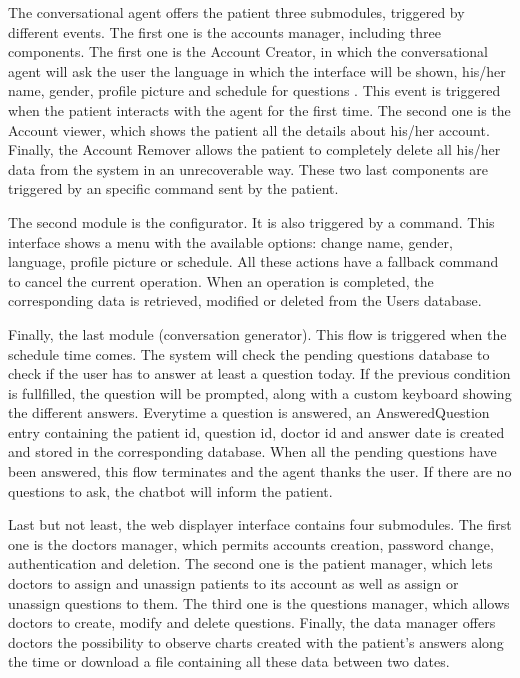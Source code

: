 \documentclass[12pt,english]{article}
\begin{document}
The conversational agent offers the patient three submodules, triggered by different events. The first one is the accounts manager, including three components. The first one is the Account Creator, in which the conversational agent will ask the user the language in which the interface will be shown, his/her name, gender, profile picture and schedule for questions . This event is triggered when the patient interacts with the agent for the first time. The second one is the Account viewer, which shows the patient all the details about his/her account. Finally, the Account Remover allows the patient to completely delete all his/her data from the system in an unrecoverable way. These two last components are triggered by an specific command sent by the patient.

The second module is the configurator. It is also triggered by a command. This interface shows a menu with the available options: change name, gender, language, profile picture or schedule. All these actions have a fallback command to cancel the current operation. When an operation is completed, the corresponding data is retrieved, modified or deleted from the Users database.

Finally, the last module (conversation generator). This flow is triggered when the schedule time comes. The system will check the pending questions database to check if the user has to answer at least a question today. If the previous condition is fullfilled, the question will be prompted, along with a custom keyboard showing the different answers. Everytime a question is answered, an AnsweredQuestion entry containing the patient id, question id, doctor id and answer date is created and stored in the corresponding database. When all the pending questions have been answered, this flow terminates and the agent thanks the user. If there are no questions to ask, the chatbot will inform the patient.

Last but not least, the web displayer interface contains four submodules. The first one is the doctors manager, which permits accounts creation, password change, authentication and deletion. The second one is the patient manager, which lets doctors to assign and unassign patients to its account as well as assign or unassign questions to them. The third one is the questions manager, which allows doctors to create, modify and delete questions. Finally, the data manager offers doctors the possibility to observe charts created with the patient's answers along the time or download a file containing all these data between two dates.
\end{document}
